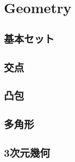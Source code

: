 \section{Geometry}

\subsection{基本セット}


\subsection{交点}


\subsection{凸包}


\subsection{多角形}


\subsection{3次元幾何}

